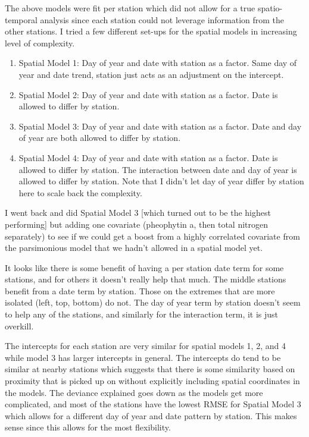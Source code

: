 \documentclass[12pt]{amsart}
\begin{document}
The above models were fit per station which did not allow for a true spatio-temporal analysis since each station could not leverage information from the other stations. I tried a few different set-ups for the spatial models in increasing level of complexity.

\begin{enumerate}
\item Spatial Model 1: Day of year and date with station as a factor. Same day of year and date trend, station just acts as an adjustment on the intercept.
\item Spatial Model 2: Day of year and date with station as a factor. Date is allowed to differ by station.
\item Spatial Model 3: Day of year and date with station as a factor. Date and day of year are both allowed to differ by station.
\item Spatial Model 4:  Day of year and date with station as a factor. Date is allowed to differ by station. The interaction between date and day of year is allowed to differ by station. Note that I didn't let day of year differ by station here to scale back the complexity.
\end{enumerate}

I went back and did Spatial Model 3 [which turned out to be the highest performing] but adding one covariate (pheophytin a, then total nitrogen separately) to see if we could get a boost from a highly correlated covariate from the parsimonious model that we hadn't allowed in a spatial model yet. 


It looks like there is some benefit of having a per station date term for some stations, and for others it doesn't really help that much. The middle stations benefit from a date term by station. Those on the extremes that are more isolated (left,  top, bottom) do not. The day of year term by station doesn't seem to help any of the stations, and similarly for the interaction term, it is just overkill. 

The intercepts for each station are very similar for spatial models 1, 2, and 4 while model 3 has larger intercepts in general. The intercepts do tend to be similar at nearby stations which suggests that there is some similarity based on proximity that is picked up on without explicitly including spatial coordinates in the models. The deviance explained goes down as the models get more complicated, and most of the stations have the lowest RMSE for Spatial Model 3 which allows for a different day of year and date pattern by station. This makes sense since this allows for the most flexibility. 
\end{document}
